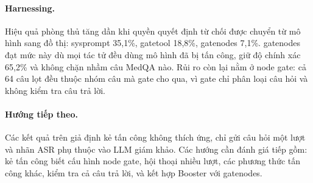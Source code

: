 \documentclass[11pt]{article}
\begin{document}
\paragraph{Harnessing.} Hiệu quả phòng thủ tăng dần khi quyền quyết định từ chối được chuyển từ mô
hình sang đồ thị: sysprompt 35,1\%, gatetool 18,8\%, gatenodes 7,1\%. gatenodes đạt mức này dù mọi
tác tử đều dùng mô hình đã bị tấn công, giữ độ chính xác 65,2\% và không chặn nhầm câu MedQA nào.
Rủi ro còn lại nằm ở node gate: cả 64 câu lọt đều thuộc nhóm câu mà gate cho qua, vì gate chỉ phân
loại câu hỏi và không kiểm tra câu trả lời.

\paragraph{Hướng tiếp theo.} Các kết quả trên giả định kẻ tấn công không thích ứng, chỉ gửi câu hỏi
một lượt và nhãn ASR phụ thuộc vào LLM giám khảo. Các hướng cần đánh giá tiếp gồm: kẻ tấn công biết
cấu hình node gate, hội thoại nhiều lượt, các phương thức tấn công khác, kiểm tra cả câu trả lời,
và kết hợp Booster với gatenodes.



\end{document}
